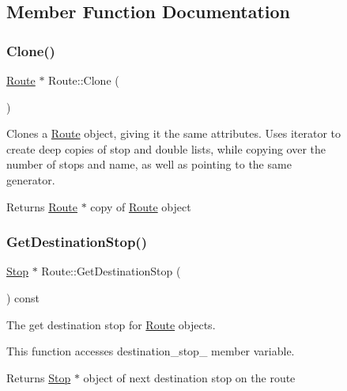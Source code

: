 \begin{figure}[H]
\begin{center}
\subsection{Member Function Documentation}
\mbox{\label{classRoute_a4031b4a218b1530e28dcf5ee5c6fa8e7}} 
\subsubsection{\texorpdfstring{Clone()}{Clone()}}
{\footnotesize\ttfamily \hyperlink{classRoute}{Route} $\ast$ Route\+::\+Clone (\begin{DoxyParamCaption}{ }\end{DoxyParamCaption})}



Clones a \hyperlink{classRoute}{Route} object, giving it the same attributes. Uses iterator to create deep copies of stop and double lists, while copying over the number of stops and name, as well as pointing to the same generator. 

\begin{DoxyReturn}{Returns}
\hyperlink{classRoute}{Route} $\ast$ copy of \hyperlink{classRoute}{Route} object 
\end{DoxyReturn}
\mbox{\label{classRoute_a44af714485a55a8b6da374399e036cc1}} 
\subsubsection{\texorpdfstring{Get\+Destination\+Stop()}{GetDestinationStop()}}
{\footnotesize\ttfamily \hyperlink{classStop}{Stop} $\ast$ Route\+::\+Get\+Destination\+Stop (\begin{DoxyParamCaption}{ }\end{DoxyParamCaption}) const}



The get destination stop for \hyperlink{classRoute}{Route} objects. 

This function accesses destination\+\_\+stop\+\_\+ member variable.

\begin{DoxyReturn}{Returns}
\hyperlink{classStop}{Stop} $\ast$ object of next destination stop on the route 
\end{DoxyReturn}
\mbox{\label{classRoute_a78274b615be2cd45006c5790290eda37}} 

\end{center}
\end{figure}
